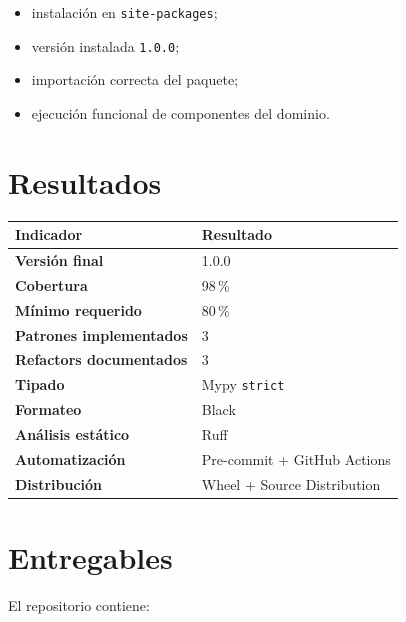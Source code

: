 \documentclass[11pt,a4paper]{article}
\begin{document}
\begin{itemize}
    \item instalación en \texttt{site-packages};
    \item versión instalada \texttt{1.0.0};
    \item importación correcta del paquete;
    \item ejecución funcional de componentes del dominio.
\end{itemize}

\section{Resultados}

\begin{center}
\renewcommand{\arraystretch}{1.3}
\begin{tabularx}{0.85\textwidth}{
    >{\bfseries}l
    X
}
\toprule
Indicador & Resultado \\
\midrule
Versión final & 1.0.0 \\
Cobertura & 98\,\% \\
Mínimo requerido & 80\,\% \\
Patrones implementados & 3 \\
Refactors documentados & 3 \\
Tipado & Mypy \texttt{strict} \\
Formateo & Black \\
Análisis estático & Ruff \\
Automatización & Pre-commit + GitHub Actions \\
Distribución & Wheel + Source Distribution \\
\bottomrule
\end{tabularx}
\end{center}


\section{Entregables}

El repositorio contiene:
\end{document}
